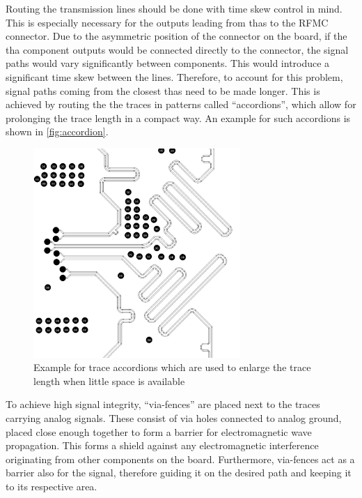 Routing the transmission lines should be done with time skew control in mind. 
This is especially necessary for the outputs leading from \glspl{tha} to the RFMC connector. 
Due to the asymmetric position of the connector on the board, if the \gls{tha} component outputs would be connected directly to the connector, the signal paths would vary significantly between components.
This would introduce a significant time skew between the lines.
Therefore, to account for this problem, signal paths coming from the closest \glspl{tha} need to be made longer.
This is achieved by routing the the traces in patterns called ``accordions'', which allow for prolonging the trace length in a compact way.
An example for such accordions is shown in \autoref{fig:accordion}.
\begin{figure}[tb]
	\centering
	\includegraphics[width = 0.7\textwidth]{chap/04-theresa/img/pcb/accordion}
	\caption[Trace accordions]{Example for trace accordions which are used to enlarge the trace length when little space is available}
	\label{fig:accordion}
\end{figure}

To achieve high signal integrity, ``via-fences'' are placed next to the traces carrying analog signals. 
These consist of via holes connected to analog ground, placed close enough together to form a barrier for electromagnetic wave propagation. 
This forms a shield against any electromagnetic interference originating from other components on the board.
Furthermore, via-fences act as a barrier also for the signal, therefore guiding it on the desired path and keeping it to its respective area.



